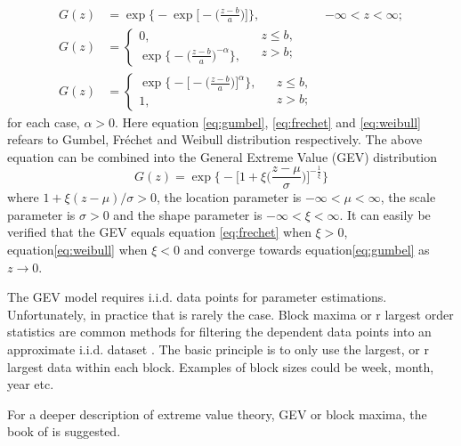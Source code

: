 \begin{align}
G(z) &=\exp\Big\{-\exp\Big[-\Big( \frac{z-b}{a}\Big) \Big]\Big\},  & -\infty < z < \infty;\label{eq:gumbel}\\
G(z) &=
  \begin{cases}
    0,\\
    \exp\big\{-\big(\frac{z-b}{a} \big)^{-\alpha} \big\},  
  \end{cases}
 \begin{split}
   &z\leq b, \\
   &z >b;\label{eq:frechet}\\
  \end{split}\\
G(z) &=
  \begin{cases}
    \exp\Big\{-\Big[-\Big( \frac{z-b}{a}\Big) \Big]^{\alpha}\Big\}, \\
    1,  
  \end{cases}  
 \begin{split}
   &z \leq b,\\
   &z>b;\label{eq:weibull}
  \end{split}
\end{align}
for each case, $\alpha>0$. Here equation \eqref{eq:gumbel}, \eqref{eq:frechet} and \eqref{eq:weibull} refears to Gumbel, Fr{\'e}chet and Weibull distribution respectively. The above equation can be combined into the General Extreme Value (GEV) distribution
\begin{equation}
\label{eq:GEV}
G(z)=\exp\Bigg\{-\Big[1+\xi \Big(\frac{z-\mu}{\sigma} \Big) \Big]^{-\frac{1}{\xi}} \Bigg\}
\end{equation}
where $1+\xi(z-\mu)/\sigma>0$, the location parameter is $-\infty<\mu<\infty$, the scale parameter is $\sigma>0$ and the shape parameter is $-\infty<\xi<\infty$. It can easily be verified that the GEV equals equation \eqref{eq:frechet} when $\xi>0$, equation\eqref{eq:weibull} when $\xi<0$ and converge towards equation\eqref{eq:gumbel} as $z \to 0$.

The GEV model requires i.i.d. data points for parameter estimations. Unfortunately, in practice that is rarely the case. Block maxima or r largest order statistics are common methods for filtering the dependent data points into an approximate i.i.d. dataset \cite[p.~66]{stuart}. The basic principle is to only use the largest, or r largest data within each block. Examples of block sizes could be week, month, year etc.

For a deeper description of extreme value theory, GEV or block maxima, the book of \cite[Chapter~3]{stuart} is suggested.

